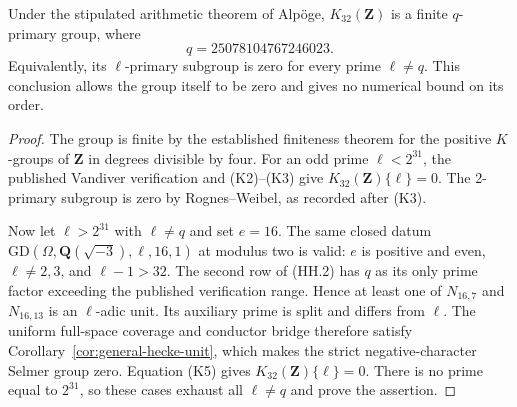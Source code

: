\begin{corollary}[K17-K32-ONEPRIME]\label{cor:k32-oneprime}
Under the stipulated arithmetic theorem of Alp\"oge,
$K_{32}(\mathbf Z)$ is a finite $q$-primary group, where
\[
                             q=25078104767246023.
\]
Equivalently, its $\ell$-primary subgroup is zero for every prime
$\ell\ne q$. This conclusion allows the group itself to be zero
and gives no numerical bound on its order.
\end{corollary}

\begin{proof}
The group is finite by the established finiteness theorem for the
positive $K$-groups of $\mathbf Z$ in degrees divisible by four.
For an odd prime $\ell<2^{31}$, the published Vandiver verification
and (K2)--(K3) give $K_{32}(\mathbf Z)\{\ell\}=0$.
The 2-primary subgroup is zero by Rognes--Weibel, as recorded after
(K3).

Now let $\ell>2^{31}$ with $\ell\ne q$ and set $e=16$.
The same closed datum
$\mathrm{GD}(\Omega,\mathbf Q(\sqrt{-3}),\ell,16,1)$ at modulus two
is valid: $e$ is positive and even, $\ell\ne2,3$, and
$\ell-1>32$.
The second row of (HH.2) has $q$ as its only prime factor exceeding
the published verification range.
Hence at least one of $N_{16,7}$ and $N_{16,13}$ is an $\ell$-adic
unit. Its auxiliary prime is split and differs from $\ell$.
The uniform full-space coverage and conductor bridge therefore
satisfy Corollary~\ref{cor:general-hecke-unit}, which makes the
strict negative-character Selmer group zero.
Equation (K5) gives $K_{32}(\mathbf Z)\{\ell\}=0$.
There is no prime equal to $2^{31}$, so these cases exhaust all
$\ell\ne q$ and prove the assertion.
\end{proof}

